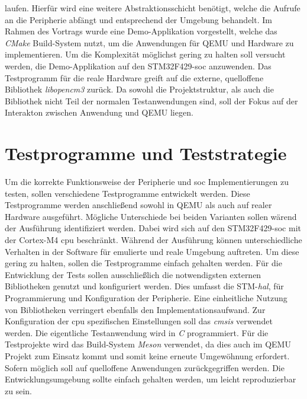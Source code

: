 laufen.
Hierfür wird eine weitere Abstraktionsschicht benötigt, welche die Aufrufe an
die Peripherie abfängt und entsprechend der Umgebung behandelt.
Im Rahmen des Vortrags wurde eine Demo-Applikation vorgestellt, welche das
\textit{CMake} Build-System nutzt, um die Anwendungen für QEMU und Hardware zu
implementieren\cite{EdiDemoRepo}.
Um die Komplexität möglichst gering zu halten soll versucht werden, die
Demo-Applikation auf den STM32F429-\ac{soc} anzuwenden.
Das Testprogramm für die reale Hardware greift auf die externe, quelloffene
Bibliothek \textit{libopencm3}\cite{LibOpenCm3} zurück.
Da sowohl die Projektstruktur, als auch die Bibliothek nicht Teil der normalen
Testanwendungen sind, soll der Fokus auf der Interakton zwischen Anwendung 
und QEMU liegen.

\section{Testprogramme und Teststrategie}
\label{sec:concept-tests}

Um die korrekte Funktionsweise der Peripherie und \ac{soc} Implementierungen zu
testen, sollen verschiedene Testprogramme entwickelt werden.
Diese Testprogramme werden anschließend sowohl in QEMU als auch auf realer
Hardware ausgeführt.
Mögliche Unterschiede bei beiden Varianten sollen wärend der Ausführung
identifiziert werden.
Dabei wird sich auf den STM32F429-\ac{soc} mit der Cortex-M4 \ac{cpu}
beschränkt.
Während der Ausführung können unterschiedliche Verhalten in der Software für
emulierte und reale Umgebung auftreten.
Um diese gering zu halten, sollen die Testprogramme einfach gehalten werden.
\newline
Für die Entwicklung der Tests sollen ausschließlich die notwendigsten externen
Bibliotheken genutzt und konfiguriert werden.
Dies umfasst die STM-\textit{\ac{hal}}, für Programmierung und Konfiguration
der Peripherie.
Eine einheitliche Nutzung von Bibliotheken verringert ebenfalls den
Implementationsaufwand.
Zur Konfiguration der \ac{cpu} spezifischen Einstellungen soll das
\textit{\ac{cmsis}} verwendet werden.
Die eigentliche Testanwendung wird in \textit{C} programmiert.
Für die Testprojekte wird das Build-System \textit{Meson} verwendet, da dies
auch im QEMU Projekt zum Einsatz kommt und somit keine erneute Umgewöhnung
erfordert.
Sofern möglich soll auf quelloffene Anwendungen zurückgegriffen werden.
Die Entwicklungsumgebung sollte einfach gehalten werden, um leicht
reproduzierbar zu sein.
